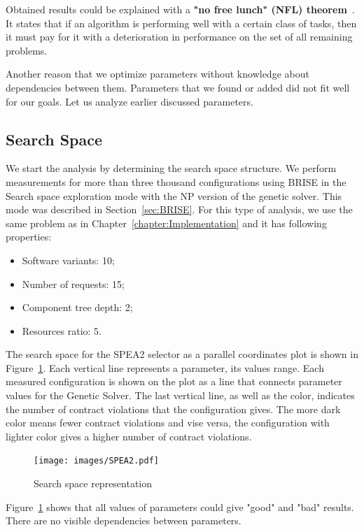 Obtained results could be explained with a \textbf{"no free lunch" (NFL) theorem}~\cite{wolpert1996, wolpert1997}. It states that if an algorithm is performing well with a certain class of tasks, then it must pay for it with a deterioration in performance on the set of all remaining problems.

Another reason that we optimize parameters without knowledge about dependencies between them. Parameters that we found or added did not fit well for our goals. Let us analyze earlier discussed parameters.

\subsection{Search Space}

We start the analysis by determining the search space structure. We perform measurements for more than three thousand configurations using BRISE in the Search space exploration mode with the NP version of the genetic solver. This mode was described in Section~\ref{sec:BRISE}. For this type of analysis, we use the same problem as in Chapter~\ref{chapter:Implementation} and it has following properties:
\begin{itemize}
	\item Software variants: 10;
	\item Number of requests: 15;
	\item Component tree depth: 2;
	\item Resources ratio: 5.
\end{itemize}

The search space for the SPEA2 selector as a parallel coordinates plot is shown in Figure~\ref{fig:SearchSpaceViewFull}.
Each vertical line represents a parameter, its values range. Each measured configuration is shown on the plot as a line that connects parameter values for the Genetic Solver. The last vertical line, as well as the color, indicates the number of contract violations that the configuration gives. The more dark color means fewer contract violations and vise versa, the configuration with lighter color gives a higher number of contract violations.

\begin{figure}
	\centering
	\texttt{[image: images/SPEA2.pdf]}
	\caption[Search space representation]{Search space representation}
	\label{fig:SearchSpaceViewFull}
\end{figure}

Figure~\ref{fig:SearchSpaceViewFull} shows that all values of parameters could give "good" and "bad" results. There are no visible dependencies between parameters. 

